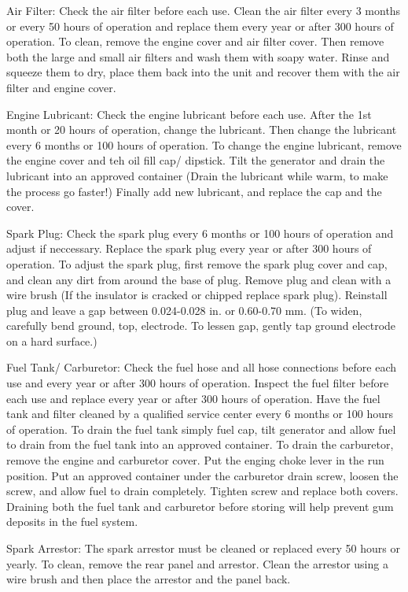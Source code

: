 \documentclass[12pt]{../SOP3_beta}
\begin{document}
\NP Air Filter: Check the air filter before each use. Clean the air filter every 3 months or every 50 hours of operation and replace them every year or after 300 hours of operation. To clean, remove the engine cover and air filter cover. Then remove both the large and small air filters and wash them with soapy water. Rinse and squeeze them to dry, place them back into the unit and recover them with the air filter and engine cover. 

\NP Engine Lubricant: Check the engine lubricant before each use. After the 1st month or 20 hours of operation, change the lubricant. Then change the lubricant every 6 months or 100 hours of operation. To change the engine lubricant, remove the engine cover and teh oil fill cap/ dipstick. Tilt the generator and drain the lubricant into an approved container (Drain the lubricant while warm, to make the process go faster!) Finally add new lubricant, and replace the cap and the cover. 

\NP Spark Plug: Check the spark plug every 6 months or 100 hours of operation and adjust if neccessary. Replace the spark plug every year or after 300 hours of operation. To adjust the spark plug, first remove the spark plug cover and cap, and clean any dirt from around the base of plug. Remove plug and clean with a wire brush (If the insulator is cracked or chipped replace spark plug). Reinstall plug and leave a gap between 0.024-0.028 in. or 0.60-0.70 mm. (To widen, carefully bend ground, top, electrode. To lessen gap, gently tap ground electrode on a hard surface.) 

\NP Fuel Tank/ Carburetor: Check the fuel hose and all hose connections before each use and every year or after 300 hours of operation. Inspect the fuel filter before each use and replace every year or after 300 hours of operation. Have the fuel tank and filter cleaned by a qualified service center every 6 months or 100 hours of operation. To drain the fuel tank simply fuel cap, tilt generator and allow fuel to drain from the fuel tank into an approved container. To drain the carburetor, remove the engine and carburetor cover. Put the enging choke lever in the run position. Put an approved container under the carburetor drain screw, loosen the screw, and allow fuel to drain completely. Tighten screw and replace both covers. Draining both the fuel tank and carburetor before storing will help prevent gum deposits in the fuel system.

\NP Spark Arrestor: The spark arrestor must be cleaned or replaced every 50 hours or yearly. To clean, remove the rear panel and arrestor. Clean the arrestor using a wire brush and then place the arrestor and the panel back.
\end{document}

